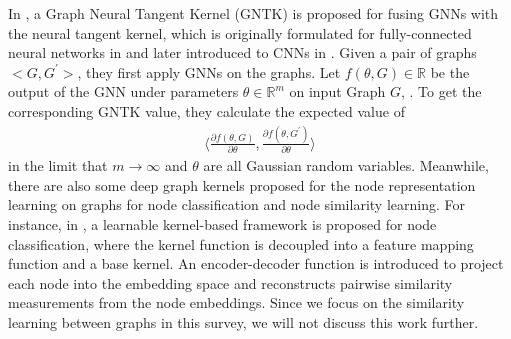 In , a Graph Neural Tangent Kernel (GNTK) is proposed for fusing GNNs with the neural tangent kernel, which is originally formulated for fully-connected neural networks in  and later introduced to CNNs in . Given a pair of graphs $<G,G^\prime>$, they first apply GNNs on the graphs. Let $f(\theta, G) \in \mathbb{R}$ be the output of the GNN under parameters $\theta \in \mathbb{R}^m$ on input Graph $G$, . To get the corresponding GNTK value, they calculate the expected value of
\begin{align}
    \Bigg \langle \frac{\partial f(\theta, G)}{\partial \theta}, \frac{\partial f(\theta, G^\prime )}{\partial \theta} \bigg \rangle
\end{align}
in the limit that $m \rightarrow \infty$ and $\theta$ are all Gaussian random variables.
Meanwhile, there are also some deep graph kernels proposed for the node representation learning on graphs for node classification and node similarity learning. For instance, in , a learnable kernel-based framework is proposed for node classification, where the kernel function is decoupled into a feature mapping function and a base kernel. An encoder-decoder function is introduced to project each node into the embedding space and reconstructs pairwise similarity measurements from the node embeddings. Since we focus on the similarity learning between graphs in this survey, we will not discuss this work further.


